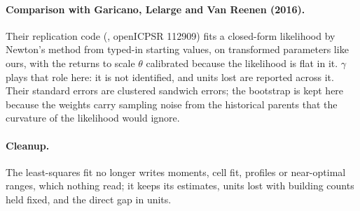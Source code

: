 \paragraph{Comparison with Garicano, Lelarge and Van Reenen (2016).} Their
replication code (, openICPSR 112909) fits a closed-form
likelihood by Newton's method from typed-in starting values, on transformed
parameters like ours, with the returns to scale $\theta$ calibrated because
the likelihood is flat in it. $\gamma$ plays that role here: it is not
identified, and units lost are reported across it. Their standard errors are
clustered sandwich errors; the bootstrap is kept here because the weights carry
sampling noise from the historical parents that the curvature of the
likelihood would ignore.

\paragraph{Cleanup.} The least-squares fit no longer writes moments, cell fit,
profiles or near-optimal ranges, which nothing read; it keeps its estimates,
units lost with building counts held fixed, and the direct gap in units.
